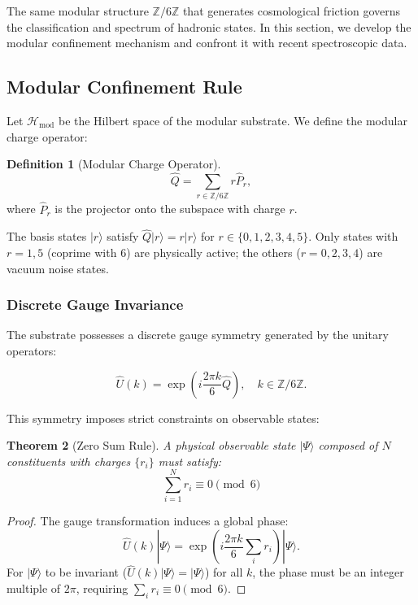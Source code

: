 \documentclass[11pt, a4paper]{article}
\theoremstyle{plain}
\newtheorem{theorem}{Theorem}[section]
\theoremstyle{definition}
\newtheorem{definition}[theorem]{Definition}
\newcommand{\Zmod}{\mathbb{Z}/6\mathbb{Z}}
\newcommand{\Hmod}{\mathcal{H}_{\text{mod}}}
\begin{document}
The same modular structure $\Zmod$ that generates cosmological friction governs the classification and spectrum of hadronic states. In this section, we develop the modular confinement mechanism and confront it with recent spectroscopic data.

\subsection{Modular Confinement Rule}

Let $\Hmod$ be the Hilbert space of the modular substrate. We define the modular charge operator:

\begin{definition}[Modular Charge Operator]
\begin{equation}
\hat{Q} = \sum_{r \in \Zmod} r \hat{P}_r,
\end{equation}
where $\hat{P}_r$ is the projector onto the subspace with charge $r$.
\end{definition}

The basis states $|r\rangle$ satisfy $\hat{Q}|r\rangle = r|r\rangle$ for $r \in \{0,1,2,3,4,5\}$. Only states with $r=1,5$ (coprime with 6) are physically active; the others ($r=0,2,3,4$) are vacuum noise states.

\subsubsection{Discrete Gauge Invariance}

The substrate possesses a discrete gauge symmetry generated by the unitary operators:

\begin{equation}
\hat{U}(k) = \exp\left(i\frac{2\pi k}{6}\hat{Q}\right), \quad k \in \Zmod.
\end{equation}

This symmetry imposes strict constraints on observable states:

\begin{theorem}[Zero Sum Rule]
A physical observable state $|\Psi\rangle$ composed of $N$ constituents with charges $\{r_i\}$ must satisfy:
\begin{equation}
\sum_{i=1}^N r_i \equiv 0 \pmod{6}
\label{eq:zero_sum_rule}
\end{equation}
\end{theorem}

\begin{proof}
The gauge transformation induces a global phase:
\begin{equation}
\hat{U}(k)|\Psi\rangle = \exp\left(i\frac{2\pi k}{6}\sum_i r_i\right)|\Psi\rangle.
\end{equation}
For $|\Psi\rangle$ to be invariant ($\hat{U}(k)|\Psi\rangle = |\Psi\rangle$) for all $k$, the phase must be an integer multiple of $2\pi$, requiring $\sum_i r_i \equiv 0 \pmod{6}$.
\end{proof}
\end{document}
